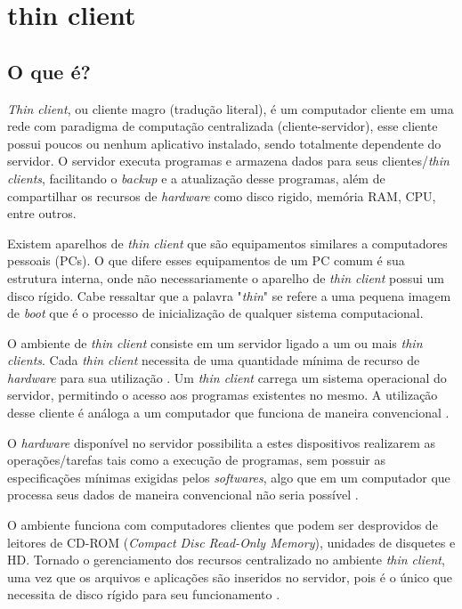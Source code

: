 \documentclass[
	12pt,				%
	openright,			%
	twoside,			%
	a4paper,			%
	chapter=TITLE,		%
	english,			%
	brazil				%
	]{abntex2}
\begin{document}
\chapter{thin client}
\label{refe:thinclient}
\section{O que é?}

\textit{Thin client}, ou cliente magro (tradução literal), é um computador cliente em uma rede  com paradigma de computação centralizada (cliente-servidor), esse cliente possui poucos ou nenhum aplicativo instalado, sendo totalmente dependente do servidor. O servidor executa programas e armazena dados para seus clientes/\textit{thin clients}, facilitando o \textit{backup} e a atualização desse programas, além de compartilhar os recursos de \textit{hardware} como disco rigido, memória RAM, CPU, entre outros\cite{ComoFuncionaThinClient, tanenbaum2010sistemas}.

Existem aparelhos de \textit{thin client} que são equipamentos similares a computadores pessoais (PCs). O que difere esses equipamentos de um PC comum é sua estrutura interna, onde não necessariamente o aparelho de \textit{thin client} possui um disco rígido. Cabe ressaltar que a palavra "\textit{thin}" se refere a uma pequena imagem de \textit{boot} que é o processo de inicialização de qualquer sistema computacional\cite{ComoFuncionaThinClient}.

O ambiente de \textit{thin client} consiste em um servidor ligado a um ou mais \textit{thin clients}. Cada \textit{thin client} necessita de uma quantidade mínima de recurso de \textit{hardware} para sua utilização \cite{TopologiaClienteThin}. Um \textit{thin client} carrega um sistema operacional do servidor, permitindo o acesso aos  programas existentes no mesmo. A utilização desse cliente é análoga a um computador que funciona de maneira convencional \cite{ComoFuncionaThinClient, morimotoservidores}.

O \textit{hardware} disponível no servidor possibilita a estes dispositivos realizarem as operações/tarefas tais como a execução de programas, sem possuir as especificações mínimas exigidas pelos \textit{softwares}, algo que em um computador que processa seus dados de maneira convencional não seria possível \cite{tanenbaum2010sistemas}.

O ambiente funciona com computadores clientes que podem ser desprovidos de leitores de CD-ROM (\textit{Compact Disc Read-Only Memory}), unidades de disquetes e HD. Tornado o gerenciamento dos recursos centralizado no ambiente \textit{thin client}, uma vez que os  arquivos e aplicações são inseridos no servidor, pois é o único que necessita de disco rígido para seu funcionamento \cite{tanenbaum2010sistemas, ComoFuncionaThinClient}.
\end{document}
